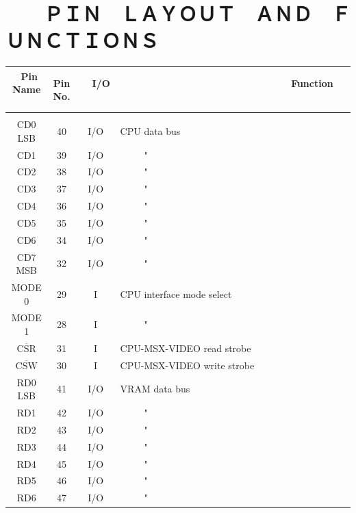 \documentclass[a4paper,10pt]{article}
\begin{document}
\newpage

\section*{　　ＰＩＮ　ＬＡＹＯＵＴ　ＡＮＤ　ＦＵＮＣＴＩＯＮＳ}

\vspace{1.5em}

\fontsize{10pt}{10pt}\selectfont
\setlength{\arrayrulewidth}{0.1em}
\setlength{\tabcolsep}{0.5em}
\renewcommand{\arraystretch}{1.4}
\noindent \begin{tabular}{|c|c|c|l|}
\hline
\ Pin Name \ & Pin No. & \ \ I/O \ \ & \ \ \ \ \ \ \ \ \ \ \ \ \ \ \ \ \ \ \ \ \ \ \ \ \ \ \ \ \ \ \ Function \ \ \ \ \ \ \ \ \ \ \ \ \ \ \ \ \ \ \ \ \ \ \ \ \ \ \ \ \ \ \ \\
\hline
& & &\\[-2.8em]
CD0 LSB & 40 & I/O & CPU data bus\\[-1.04em]
CD1 & 39 & I/O & \ \ \ \ \ "\\[-1.04em]
CD2 & 38 & I/O & \ \ \ \ \ "\\[-1.04em]
CD3 & 37 & I/O & \ \ \ \ \ "\\[-1.04em]
CD4 & 36 & I/O & \ \ \ \ \ "\\[-1.04em]
CD5 & 35 & I/O & \ \ \ \ \ "\\[-1.04em]
CD6 & 34 & I/O & \ \ \ \ \ "\\[-1.04em]
CD7 MSB & 32 & I/O & \ \ \ \ \ "\\[-1.04em]
MODE 0 & 29 & I & CPU interface mode select\\[-1.04em]
MODE 1 & 28 & I & \ \ \ \ \ "\\[-1.04em]
$\overline{\mbox{CSR}}$ & 31 & I & CPU-MSX-VIDEO read strobe\\[-1.04em]
$\overline{\mbox{CSW}}$ & 30 & I & CPU-MSX-VIDEO write strobe\\[-1.04em]
RD0 LSB & 41 & I/O & VRAM data bus\\[-1.04em]
RD1 & 42 & I/O & \ \ \ \ \ "\\[-1.04em]
RD2 & 43 & I/O & \ \ \ \ \ "\\[-1.04em]
RD3 & 44 & I/O & \ \ \ \ \ "\\[-1.04em]
RD4 & 45 & I/O & \ \ \ \ \ "\\[-1.04em]
RD5 & 46 & I/O & \ \ \ \ \ "\\[-1.04em]
RD6 & 47 & I/O & \ \ \ \ \ "\\[-1.04em]

\end{tabular}
\end{document}

